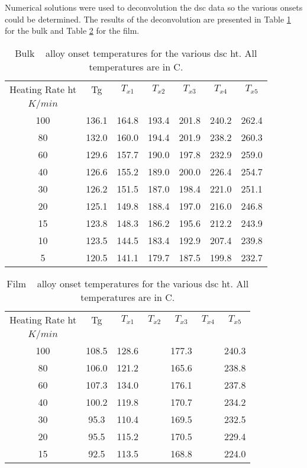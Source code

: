 \documentclass[draft,a4paper,12pt,oneside]{article}%
\begin{document}
Numerical solutions were used to deconvolution the \acrshort{dsc} data so the various \Tx onsets could be determined. The results of the deconvolution are presented in Table \ref{tab:BulkOnsets} for the bulk and Table \ref{tab:FilmOnsets} for the film.

\begin{table}[h]
	\centering
	\begin{tabular}{ c c c c c c c }
		\toprule
		Heating Rate \acrshort{ht} & \acrshort{Tg} & $T_{x1}$ & $T_{x2}$ & $T_{x3}$ & $T_{x4}$ & $T_{x5}$ \\ 
		$K/min$ & & & & & & \\
		\midrule
		100 & 136.1 & 164.8 & 193.4 & 201.8 & 240.2 & 262.4 \\
		80  & 132.0 & 160.0 & 194.4 & 201.9 & 238.2 & 260.3 \\
		60  & 129.6 & 157.7 & 190.0 & 197.8 & 232.9 & 259.0 \\
		40  & 126.6 & 155.2 & 189.0 & 200.0 & 226.4 & 254.7 \\
		30  & 126.2 & 151.5 & 187.0 & 198.4 & 221.0 & 251.1 \\
		20  & 125.1 & 149.8 & 188.4 & 197.0 & 216.0 & 246.8 \\
		15  & 123.8 & 148.3 & 186.2 & 195.6 & 212.2 & 243.9 \\
		10  & 123.5 & 144.5 & 183.4 & 192.9 & 207.4 & 239.8 \\
		5   & 120.5 & 141.1 & 179.7 & 187.5 & 199.8 & 232.7 \\ 
		\bottomrule
	\end{tabular}
	\caption{Bulk \MgZnCa~ alloy onset temperatures for the various \acrshort{dsc}  \acrshort{ht}. All temperatures are in \degree C.}
	\label{tab:BulkOnsets}
\end{table}

\begin{table}[h]
	\centering
	\begin{tabular}{ c c c c c c c }
		\toprule
		Heating Rate \acrshort{ht} & \acrshort{Tg} & $T_{x1}$ & $T_{x2}$ & $T_{x3}$ & $T_{x4}$ & $T_{x5}$ \\ 
		$K/min$ & & & & & & \\
		\midrule
		100 & 108.5 & 128.6 &  & 177.3 &  & 240.3 \\
		80  & 106.0 & 121.2 &  & 165.6 &  & 238.8 \\
		60  & 107.3 & 134.0 &  & 176.1 &  & 237.8 \\
		40  & 100.2 & 119.8 &  & 170.7 &  & 234.2 \\
		30  & 95.3  & 110.4 &  & 169.5 &  & 232.5 \\
		20  & 95.5  & 115.2 &  & 170.5 &  & 229.4 \\
		15  & 92.5  & 113.5 &  & 168.8 &  & 224.0 \\
		\bottomrule
	\end{tabular}
	\caption{Film \MgZnCa~ alloy onset temperatures for the various \acrshort{dsc}  \acrshort{ht}. All temperatures are in \degree C.}
	\label{tab:FilmOnsets}
\end{table}
\end{document}
